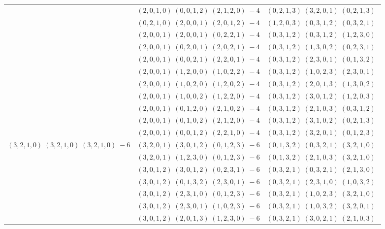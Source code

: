 \documentclass[11pt]{article}
\begin{document}
\begin{longtable}[l]{|c|c|c|}
 \cline{2-3} 
 & $(2 ,0 ,1 ,0) \;(0 ,0 ,1 ,2) \;(2 ,1 ,2 ,0) \;-4$ & $(0 ,2 ,1 ,3) \;(3 ,2 ,0 ,1) \;(0 ,2 ,1 ,3) \;$\\ 
 \cline{2-3} 
 & $(0 ,2 ,1 ,0) \;(2 ,0 ,0 ,1) \;(2 ,0 ,1 ,2) \;-4$ & $(1 ,2 ,0 ,3) \;(0 ,3 ,1 ,2) \;(0 ,3 ,2 ,1) \;$\\ 
 \cline{2-3} 
 & $(2 ,0 ,0 ,1) \;(2 ,0 ,0 ,1) \;(0 ,2 ,2 ,1) \;-4$ & $(0 ,3 ,1 ,2) \;(0 ,3 ,1 ,2) \;(1 ,2 ,3 ,0) \;$\\ 
 \cline{2-3} 
 & $(2 ,0 ,0 ,1) \;(0 ,2 ,0 ,1) \;(2 ,0 ,2 ,1) \;-4$ & $(0 ,3 ,1 ,2) \;(1 ,3 ,0 ,2) \;(0 ,2 ,3 ,1) \;$\\ 
 \cline{2-3} 
 & $(2 ,0 ,0 ,1) \;(0 ,0 ,2 ,1) \;(2 ,2 ,0 ,1) \;-4$ & $(0 ,3 ,1 ,2) \;(2 ,3 ,0 ,1) \;(0 ,1 ,3 ,2) \;$\\ 
 \cline{2-3} 
 & $(2 ,0 ,0 ,1) \;(1 ,2 ,0 ,0) \;(1 ,0 ,2 ,2) \;-4$ & $(0 ,3 ,1 ,2) \;(1 ,0 ,2 ,3) \;(2 ,3 ,0 ,1) \;$\\ 
 \cline{2-3} 
 & $(2 ,0 ,0 ,1) \;(1 ,0 ,2 ,0) \;(1 ,2 ,0 ,2) \;-4$ & $(0 ,3 ,1 ,2) \;(2 ,0 ,1 ,3) \;(1 ,3 ,0 ,2) \;$\\ 
 \cline{2-3} 
 & $(2 ,0 ,0 ,1) \;(1 ,0 ,0 ,2) \;(1 ,2 ,2 ,0) \;-4$ & $(0 ,3 ,1 ,2) \;(3 ,0 ,1 ,2) \;(1 ,2 ,0 ,3) \;$\\ 
 \cline{2-3} 
 & $(2 ,0 ,0 ,1) \;(0 ,1 ,2 ,0) \;(2 ,1 ,0 ,2) \;-4$ & $(0 ,3 ,1 ,2) \;(2 ,1 ,0 ,3) \;(0 ,3 ,1 ,2) \;$\\ 
 \cline{2-3} 
 & $(2 ,0 ,0 ,1) \;(0 ,1 ,0 ,2) \;(2 ,1 ,2 ,0) \;-4$ & $(0 ,3 ,1 ,2) \;(3 ,1 ,0 ,2) \;(0 ,2 ,1 ,3) \;$\\ 
 \cline{2-3} 
 & $(2 ,0 ,0 ,1) \;(0 ,0 ,1 ,2) \;(2 ,2 ,1 ,0) \;-4$ & $(0 ,3 ,1 ,2) \;(3 ,2 ,0 ,1) \;(0 ,1 ,2 ,3) \;$\\ \hline\multirow[t]{7}{*}{ $(3 ,2 ,1 ,0) \;(3 ,2 ,1 ,0) \;(3 ,2 ,1 ,0) \;-6$ }  & $(3 ,2 ,0 ,1) \;(3 ,0 ,1 ,2) \;(0 ,1 ,2 ,3) \;-6$ & $(0 ,1 ,3 ,2) \;(0 ,3 ,2 ,1) \;(3 ,2 ,1 ,0) \;$\\ 
 \cline{2-3} 
 & $(3 ,2 ,0 ,1) \;(1 ,2 ,3 ,0) \;(0 ,1 ,2 ,3) \;-6$ & $(0 ,1 ,3 ,2) \;(2 ,1 ,0 ,3) \;(3 ,2 ,1 ,0) \;$\\ 
 \cline{2-3} 
 & $(3 ,0 ,1 ,2) \;(3 ,0 ,1 ,2) \;(0 ,2 ,3 ,1) \;-6$ & $(0 ,3 ,2 ,1) \;(0 ,3 ,2 ,1) \;(2 ,1 ,3 ,0) \;$\\ 
 \cline{2-3} 
 & $(3 ,0 ,1 ,2) \;(0 ,1 ,3 ,2) \;(2 ,3 ,0 ,1) \;-6$ & $(0 ,3 ,2 ,1) \;(2 ,3 ,1 ,0) \;(1 ,0 ,3 ,2) \;$\\ 
 \cline{2-3} 
 & $(3 ,0 ,1 ,2) \;(2 ,3 ,1 ,0) \;(0 ,1 ,2 ,3) \;-6$ & $(0 ,3 ,2 ,1) \;(1 ,0 ,2 ,3) \;(3 ,2 ,1 ,0) \;$\\ 
 \cline{2-3} 
 & $(3 ,0 ,1 ,2) \;(2 ,3 ,0 ,1) \;(1 ,0 ,2 ,3) \;-6$ & $(0 ,3 ,2 ,1) \;(1 ,0 ,3 ,2) \;(3 ,2 ,0 ,1) \;$\\ 
 \cline{2-3} 
 & $(3 ,0 ,1 ,2) \;(2 ,0 ,1 ,3) \;(1 ,2 ,3 ,0) \;-6$ & $(0 ,3 ,2 ,1) \;(3 ,0 ,2 ,1) \;(2 ,1 ,0 ,3) \;$\\ \hline
  
 \end{longtable} 
 
\end{document}
